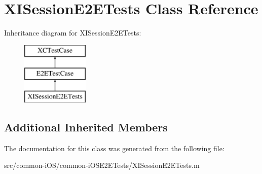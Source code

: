 \hypertarget{interface_x_i_session_e2_e_tests}{}\section{X\+I\+Session\+E2\+E\+Tests Class Reference}
\label{interface_x_i_session_e2_e_tests}
Inheritance diagram for X\+I\+Session\+E2\+E\+Tests\+:\begin{figure}[H]
\begin{center}
\leavevmode
\includegraphics[height=3.000000cm]{interface_x_i_session_e2_e_tests}
\end{center}
\end{figure}
\subsection*{Additional Inherited Members}


The documentation for this class was generated from the following file\+:\begin{DoxyCompactItemize}
\item 
src/common-\/i\+O\+S/common-\/i\+O\+S\+E2\+E\+Tests/X\+I\+Session\+E2\+E\+Tests.\+m\end{DoxyCompactItemize}
